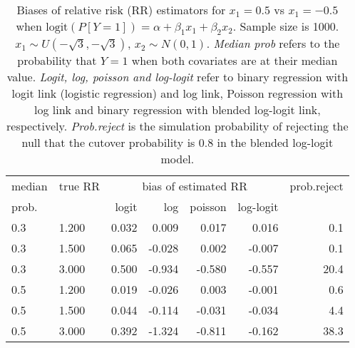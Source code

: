 \documentclass[12pt,a4paper]{article}
\begin{document}
\begin{table}[H] 
\small\sf\centering 
\caption{Biases of relative risk (RR) estimators for $x_1=0.5$ vs $x_1=-0.5$ when $\mbox{logit}(P[Y=1])=\alpha+\beta_1 x_1 + \beta_2 x_2$. Sample size is 1000. $x_1 \sim $$U(-\sqrt{3},-\sqrt{3})$, $x_2 \sim N(0,1)$. {\it Median prob} refers to the probability that $Y=1$ when both covariates are at their median value. {\it Logit, log, poisson and log-logit} refer to binary regression with logit link (logistic regression) and log link, Poisson regression with log link and binary regression with blended log-logit link, respectively. {\it Prob.reject} is the simulation probability of rejecting the null that the cutover probability is $0.8$ in the blended log-logit model.} 
\begin{tabular}{llrrrrr} 
\toprule 
median & true RR & \multicolumn{4}{c}{bias of estimated RR} & prob.reject \\ 
prob. & & logit & log & poisson & log-logit  & \\ \midrule 
0.3 & 1.200 & 0.032 &  0.009 &  0.017 &  0.016 &  0.1 \\  
0.3 & 1.500 & 0.065 & -0.028 &  0.002 & -0.007 &  0.1 \\  
0.3 & 3.000 & 0.500 & -0.934 & -0.580 & -0.557 & 20.4 \\  
0.5 & 1.200 & 0.019 & -0.026 &  0.003 & -0.001 &  0.6 \\  
0.5 & 1.500 & 0.044 & -0.114 & -0.031 & -0.034 &  4.4 \\  
0.5 & 3.000 & 0.392 & -1.324 & -0.811 & -0.162 & 38.3 \\  
\bottomrule 
\end{tabular} 
\end{table} 
\end{document}
